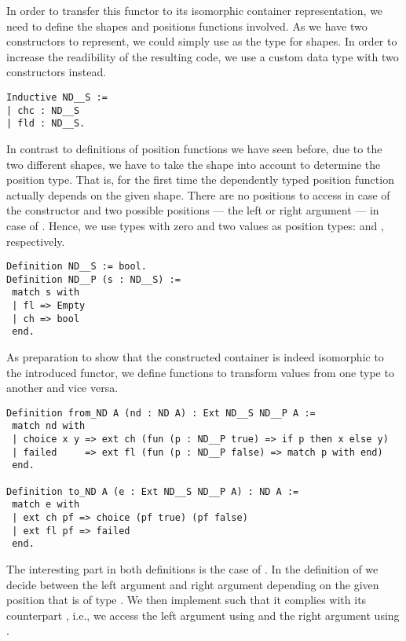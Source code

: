 In order to transfer this functor to its isomorphic container representation, we need to define the shapes and positions functions involved.
As we have two constructors to represent, we could simply use  as the type for shapes.
In order to increase the readibility of the resulting code, we use a custom data type with two constructors instead.

\begin{verbatim}
Inductive ND__S :=
| chc : ND__S
| fld : ND__S.
\end{verbatim}

In contrast to definitions of position functions we have seen before, due to the two different shapes, we have to take the shape into account to determine the position type.
That is, for the first time the dependently typed position function actually depends on the given shape.
There are no positions to access in case of the  constructor and two possible positions --- the left or right argument --- in case of .
Hence, we use types with zero and two values as position types:  and , respectively.

\begin{verbatim}
Definition ND__S := bool.
Definition ND__P (s : ND__S) :=
 match s with
 | fl => Empty
 | ch => bool
 end.
\end{verbatim}

As preparation to show that the constructed container is indeed isomorphic to the introduced functor, we define functions to transform values from one type to another and vice versa.

\begin{verbatim}
Definition from_ND A (nd : ND A) : Ext ND__S ND__P A :=
 match nd with
 | choice x y => ext ch (fun (p : ND__P true) => if p then x else y)
 | failed     => ext fl (fun (p : ND__P false) => match p with end)
 end.

Definition to_ND A (e : Ext ND__S ND__P A) : ND A :=
 match e with
 | ext ch pf => choice (pf true) (pf false)
 | ext fl pf => failed
 end.
\end{verbatim}

The interesting part in both definitions is the case of .
In the definition of  we decide between the left argument  and right argument  depending on the given position  that is of type .
We then implement  such that it complies with its counterpart , i.e., we access the left argument using  and the right argument using .

